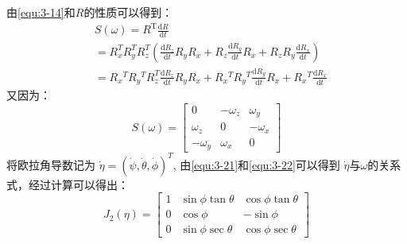 由\autoref{equ:3-14}和$R$的性质可以得到：
\begin{equation}
    \begin{aligned}
        \label{equ:3-21}
&S(\omega)=R^\mathrm{T}\frac{\mathrm{d}R}{\mathrm{d}t} \\
&=R_x^TR_y^TR_z^T\left(\frac{\mathrm{d}R_z}{\mathrm{d}t}R_yR_x+R_z\frac{\mathrm{d}R_y}{\mathrm{d}t}R_x+R_zR_y\frac{\mathrm{d}R_x}{\mathrm{d}t}\right) \\
&=R_x{}^TR_y{}^TR_z^T\frac{\mathrm{d}R_z}{\mathrm{d}t}R_yR_x+R_x{}^TR_y{}^T\frac{\mathrm{d}R_y}{\mathrm{d}t}R_x+R_x{}^T\frac{\mathrm{d}R_x}{\mathrm{d}t}
\end{aligned}
\end{equation}
又因为：
\begin{equation}
    \label{equ:3-22}
    S(\omega)=\begin{bmatrix}0&-\omega_z&\omega_y\\\omega_z&0&-\omega_x\\-\omega_y&\omega_x&0\end{bmatrix}
\end{equation}
将欧拉角导数记为 $\dot{\eta}=(\dot{\psi},\dot{\theta},\dot{\phi})^{T}$,
由\autoref{equ:3-21}和\autoref{equ:3-22}可以得到
 $\dot{\eta}$与$\omega$的关系式，经过计算可以得出：
 \begin{equation}
    J_2(\eta)=\begin{bmatrix}1&\sin\phi\tan\theta&\cos\phi\tan\theta\\0&\cos\phi&-\sin\phi\\0&\sin\phi\sec\theta&\cos\phi\sec\theta\end{bmatrix}
\end{equation}

